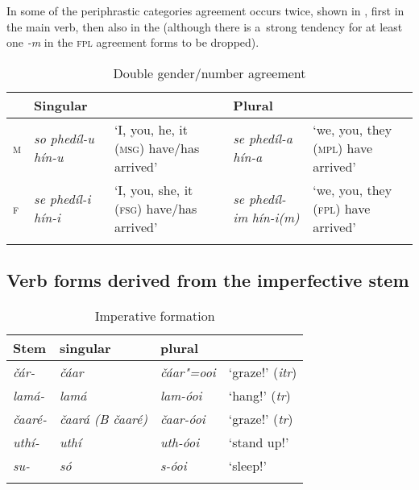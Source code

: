 In some of the periphrastic categories agreement occurs twice, shown in , first in the main verb, then also in the  (although there is a~strong tendency for at least one \textit{-m} in the \textsc{fpl} agreement forms to be dropped).


\begin{table}[p]
\caption{Double {gender}/number agreement}

\begin{tabularx}{\textwidth}{ l P{20mm} Q P{20mm} Q }
\lsptoprule
&
Singular &
&
Plural &
\\\midrule
\textsc{m} &
\textit{so phedíl-u hín-u} &
`I, you, he, it (\textsc{msg}) have/has arrived' &
\textit{se phedíl-a hín-a} &
`we, you, they (\textsc{mpl}) have arrived'\\
\textsc{f} &
\textit{se phedíl-i hín-i} &
`I, you, she, it (\textsc{fsg}) have/has arrived' &
\textit{se phedíl-im}
\textit{hín-i(m)} &
`we, you, they (\textsc{fpl}) have arrived'\\\lspbottomrule
\end{tabularx}
\label{tab:8-21}
\end{table}


\subsection{Verb forms derived from the {imperfective} stem}
\label{subsec:8-4-2}



\begin{table}
\caption{{Imperative} formation}
\begin{tabularx}{\textwidth}{ Q l@{\hspace{20pt}} l@{\hspace{20pt}} Q }
\lsptoprule
Stem &
 singular &
 plural &
\\\midrule
\textit{čár-} &
\textit{čáar} &
\textit{čáar"=ooi} &
`graze!' (\textit{itr})\\
\textit{lamá-} &
\textit{lamá} &
\textit{lam-óoi} &
`hang!' (\textit{tr})\\
\textit{čaaré-} &
\textit{čaará (B čaaré)} &
\textit{čaar-óoi} &
`graze!' (\textit{tr})\\
\textit{uthí-} &
\textit{uthí} &
\textit{uth-óoi} &
`stand up!'\\
\textit{su-} &
\textit{só} &
\textit{s-óoi} &
`sleep!'\\\lspbottomrule
\end{tabularx}
\label{tab:8-22}
\end{table}



